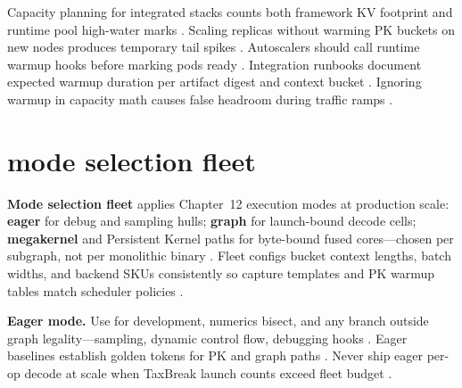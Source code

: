 Capacity planning for integrated stacks counts both framework KV footprint and runtime pool high-water marks \citep{kwon2023vllm,memoryfloor2026,yirage2026,chen2020compilerbasedhardw,patel2025llminference,dlbook}. Scaling replicas without warming PK buckets on new nodes produces temporary tail spikes \citep{memoryfloor2026,nvidia2024cudagraphs,yirage2026,chen2020compilerbasedhardw,patel2025llminference,kwon2023vllm,dlbook}. Autoscalers should call runtime warmup hooks before marking pods ready \citep{yirage2026,chen2020compilerbasedhardw,patel2025llminference,kwon2023vllm,dlbook}. Integration runbooks document expected warmup duration per artifact digest and context bucket \citep{memoryfloor2026,yirage2026,chen2020compilerbasedhardw,patel2025llminference,dlbook}. Ignoring warmup in capacity math causes false headroom during traffic ramps \citep{patel2025llminference,memoryfloor2026,yirage2026,chen2020compilerbasedhardw,kwon2023vllm,dlbook}.

\section{mode selection fleet}
\label{sec:ch30_mode_selection_fleet}

\textbf{Mode selection fleet} applies Chapter~12 execution modes at production scale: \textbf{eager} for debug and sampling hulls; \textbf{graph} for launch-bound decode cells; \textbf{megakernel} and Persistent Kernel paths for byte-bound fused cores---chosen per subgraph, not per monolithic binary \citep{nvidia2024cudagraphs,yirage2026,taxbreak2026,memoryfloor2026,patel2025llminference,chen2020compilerbasedhardw,kwon2023vllm,liu2024deepseekv3,dao2022flashattention,semianalysis2024tma,dlbook,amd2024xdna,amd2024aie,dao2023flashdecoding,nvidia2022hopper}. Fleet configs bucket context lengths, batch widths, and backend SKUs consistently so capture templates and PK warmup tables match scheduler policies \citep{patel2025llminference,memoryfloor2026,taxbreak2026,yirage2026,chen2020compilerbasedhardw,kwon2023vllm,dlbook}.

\textbf{Eager mode.} Use for development, numerics bisect, and any branch outside graph legality---sampling, dynamic control flow, debugging hooks \citep{nvidia2024cudagraphs,patel2025llminference,yirage2026,chen2020compilerbasedhardw,kwon2023vllm,dlbook}. Eager baselines establish golden tokens for PK and graph paths \citep{yirage2026,chen2020compilerbasedhardw,patel2025llminference,dlbook}. Never ship eager per-op decode at scale when TaxBreak launch counts exceed fleet budget \citep{taxbreak2026,patel2025llminference,yirage2026,chen2020compilerbasedhardw,kwon2023vllm,dlbook}.

